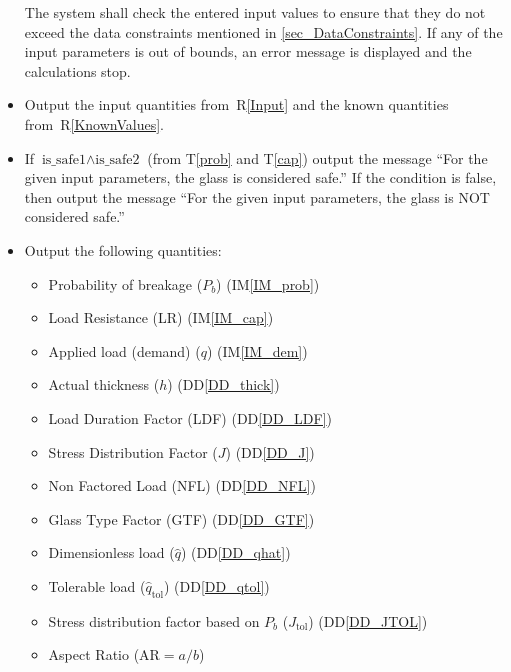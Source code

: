 \documentclass[12pt]{article}
\newcommand{\ddref}[1]{DD\ref{#1}}
\newcommand{\tref}[1]{T\ref{#1}}
\newcommand{\iref}[1]{IM\ref{#1}}
\newcounter{reqnum} %
\newcommand{\rref}[1]{R\ref{#1}}
\begin{document}
\begin{itemize}
  The system shall check the entered input values to ensure that they do not
  exceed the data constraints mentioned in \ref{sec_DataConstraints}.  If any of
  the input parameters is out of bounds, an error message is displayed and the
  calculations stop.

\item[R\refstepcounter{reqnum}\thereqnum \label{R_OutputInput}:]

  Output the input quantities from~\rref{Input} and the known quantities
  from~\rref{KnownValues}.


\item[R\refstepcounter{reqnum}\thereqnum \label{R_ Comparison}:] If
  $\text{is\_safe1} \wedge \text{is\_safe2}$ (from \tref{prob} and \tref{cap})
  output the message ``For the given input parameters, the glass is considered
  safe.''  If the condition is false, then output the message ``For the given
  input parameters, the glass is NOT considered safe.''

\item[R\refstepcounter{reqnum}\thereqnum \label{R_Output}:]
  Output the following quantities:
\begin{itemize}
\item Probability of breakage ($P_b$) (\iref{IM_prob})
\item Load Resistance (LR) (\iref{IM_cap})
\item Applied load (demand) ($q$) (\iref{IM_dem})
\item Actual thickness ($h$) (\ddref{DD_thick})
\item Load Duration Factor (LDF) (\ddref{DD_LDF})
\item Stress Distribution Factor ($J$) (\ddref{DD_J})
\item Non Factored Load (NFL) (\ddref{DD_NFL})
\item Glass Type Factor (GTF) (\ddref{DD_GTF})
\item Dimensionless load ($\hat{q}$) (\ddref{DD_qhat})
\item Tolerable load ($\hat{q}_{\text{tol}}$) (\ddref{DD_qtol})
\item Stress distribution factor based on $P_b$ ($J_{\text{tol}}$) (\ddref{DD_JTOL})
\item Aspect Ratio ($\text{AR} = a/b$)
\end{itemize}

\end{itemize}
\end{document}
